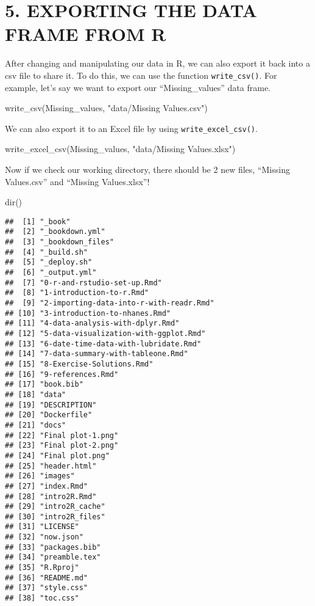 \documentclass[
]{book}
\newenvironment{Shaded}{\begin{snugshade}}{\end{snugshade}}
\newcommand{\FunctionTok}[1]{\textcolor[rgb]{0.00,0.00,0.00}{#1}}
\newcommand{\NormalTok}[1]{#1}
\newcommand{\StringTok}[1]{\textcolor[rgb]{0.31,0.60,0.02}{#1}}
\begin{document}
\hypertarget{exporting-the-data-frame-from-r}{%
\section{5. EXPORTING THE DATA FRAME FROM R}\label{exporting-the-data-frame-from-r}}

After changing and manipulating our data in R, we can also export it back into a csv file to share it. To do this, we can use the function \texttt{write\_csv()}. For example, let's say we want to export our ``Missing\_values'' data frame.

\begin{Shaded}
\begin{Highlighting}[]
\FunctionTok{write\_csv}\NormalTok{(Missing\_values, }\StringTok{"data/Missing Values.csv"}\NormalTok{)}
\end{Highlighting}
\end{Shaded}

We can also export it to an Excel file by using \texttt{write\_excel\_csv()}.

\begin{Shaded}
\begin{Highlighting}[]
\FunctionTok{write\_excel\_csv}\NormalTok{(Missing\_values, }\StringTok{"data/Missing Values.xlsx"}\NormalTok{)}
\end{Highlighting}
\end{Shaded}

Now if we check our working directory, there should be 2 new files, ``Missing Values.csv'' and ``Missing Values.xlsx''!

\begin{Shaded}
\begin{Highlighting}[]
\FunctionTok{dir}\NormalTok{()}
\end{Highlighting}
\end{Shaded}

\begin{verbatim}
##  [1] "_book"
##  [2] "_bookdown.yml"
##  [3] "_bookdown_files"
##  [4] "_build.sh"
##  [5] "_deploy.sh"
##  [6] "_output.yml"
##  [7] "0-r-and-rstudio-set-up.Rmd"
##  [8] "1-introduction-to-r.Rmd"
##  [9] "2-importing-data-into-r-with-readr.Rmd"
## [10] "3-introduction-to-nhanes.Rmd"
## [11] "4-data-analysis-with-dplyr.Rmd"
## [12] "5-data-visualization-with-ggplot.Rmd"
## [13] "6-date-time-data-with-lubridate.Rmd"
## [14] "7-data-summary-with-tableone.Rmd"
## [15] "8-Exercise-Solutions.Rmd"
## [16] "9-references.Rmd"
## [17] "book.bib"
## [18] "data"
## [19] "DESCRIPTION"
## [20] "Dockerfile"
## [21] "docs"
## [22] "Final plot-1.png"
## [23] "Final plot-2.png"
## [24] "Final plot.png"
## [25] "header.html"
## [26] "images"
## [27] "index.Rmd"
## [28] "intro2R.Rmd"
## [29] "intro2R_cache"
## [30] "intro2R_files"
## [31] "LICENSE"
## [32] "now.json"
## [33] "packages.bib"
## [34] "preamble.tex"
## [35] "R.Rproj"
## [36] "README.md"
## [37] "style.css"
## [38] "toc.css"
\end{verbatim}
\end{document}

